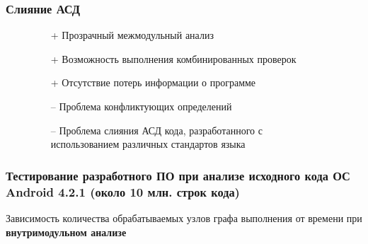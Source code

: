 \documentclass[hyperref={pdfpagelabels=false},10pt]{beamer}
\begin{document}
\begin{frame}
\frametitle{Слияние АСД}
\begin{figure}[h]
  \begin{minipage}[h]{0.49\linewidth}
\begin{itemize}
 \item[+] Прозрачный межмодульный анализ
 \item[+] Возможность выполнения комбинированных проверок
 \item[+] Отсутствие потерь информации о программе
\end{itemize}
  \end{minipage}
  \hfill
  \begin{minipage}[h]{0.49\linewidth}
\begin{itemize}
 \item[--] Проблема конфликтующих определений
 \item[--] Проблема слияния АСД кода, разработанного с использованием различных стандартов языка
\end{itemize}
  \end{minipage}
\end{figure}
\end{frame}


\begin{frame}
\frametitle{Тестирование разработного ПО при анализе исходного кода ОС Android 4.2.1 (около 10 млн. строк кода)}
Зависимость количества обрабатываемых узлов графа выполнения от времени  при \textbf{внутримодульном анализе}
\begin{figure}[h]
\end{figure}
\end{frame}
\end{document}
